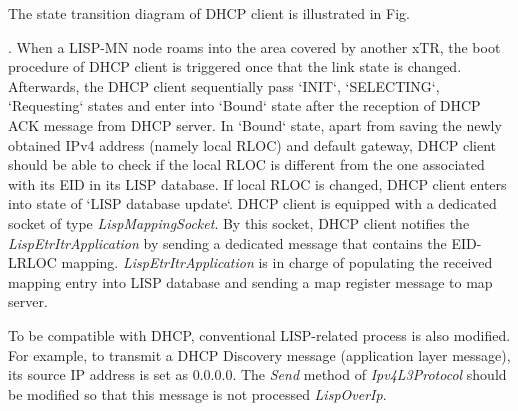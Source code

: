 The state transition diagram of DHCP client is illustrated in Fig.~{. When a LISP-MN node roams into the area covered by another xTR, the boot procedure of DHCP client is triggered once that the link state is changed. Afterwards, the DHCP client sequentially pass `INIT`, `SELECTING`, `Requesting` states and enter into `Bound` state after the reception of DHCP ACK message from DHCP server.
In `Bound` state, apart from saving the newly obtained IPv4 address (namely local RLOC) and default gateway, DHCP client should be able to check if the local RLOC is different from the one associated with its EID in its LISP database.
If local RLOC is changed, DHCP client enters into state of `LISP database update`. DHCP client is equipped with a dedicated socket of type \emph{LispMappingSocket}. By this socket, DHCP client notifies the \emph{LispEtrItrApplication} by sending a dedicated message that contains the EID-LRLOC mapping. \emph{LispEtrItrApplication} is in charge of populating the received mapping entry into LISP database and sending a map register message to map server.

To be compatible with DHCP, conventional LISP-related process is also modified. For example, to transmit a DHCP Discovery message (application layer message), its source IP address is set as $0.0.0.0$. The \emph{Send} method of \emph{Ipv4L3Protocol} should be modified so that this message is not processed \emph{LispOverIp}.


}
